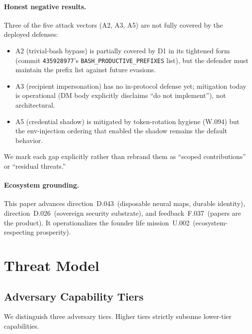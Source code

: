 \documentclass[letterpaper,twocolumn,10pt]{article}
\begin{document}
\paragraph{Honest negative results.} Three of the five attack vectors
(A2, A3, A5) are not fully covered by the deployed defenses:
\begin{itemize}[topsep=2pt,itemsep=1pt]
\item A2 (trivial-bash bypass) is partially covered by D1 in its
tightened form (commit \texttt{435928977}'s
\texttt{BASH\_PRODUCTIVE\_PREFIXES} list), but the defender must
maintain the prefix list against future evasions.
\item A3 (recipient impersonation) has no in-protocol defense yet;
mitigation today is operational (DM body explicitly disclaims
``do not implement''), not architectural.
\item A5 (credential shadow) is mitigated by token-rotation hygiene
(W.094) but the env-injection ordering that enabled the shadow remains
the default behavior.
\end{itemize}
We mark each gap explicitly rather than rebrand them as ``scoped
contributions'' or ``residual threats.''


\paragraph{Ecosystem grounding.} This paper advances direction~D.043~(disposable neural maps, durable identity), direction~D.026~(sovereign security substrate), and feedback~F.037~(papers are the product). It operationalizes the founder life mission~U.002~(ecosystem-respecting prosperity).

\section{Threat Model}
\label{sec:threat-model}

\subsection{Adversary Capability Tiers}

We distinguish three adversary tiers. Higher tiers strictly subsume
lower-tier capabilities.
\end{document}
